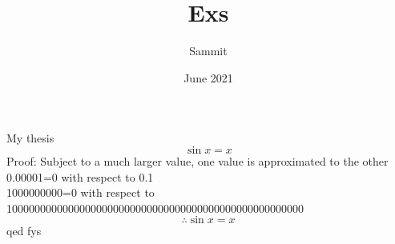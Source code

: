 \documentclass{article}
\title{Exs}
\author{Sammit }
\date{June 2021}
\begin{document}
My thesis
$$\sin x = x$$
Proof: Subject to a much larger value, one value is approximated to the other
0.00001=0 with respect to 0.1
\\1000000000=0 with respect to 10000000000000000000000000000000000000000000000000000
$$\therefore \sin x = x$$
qed fys
\end{document}

